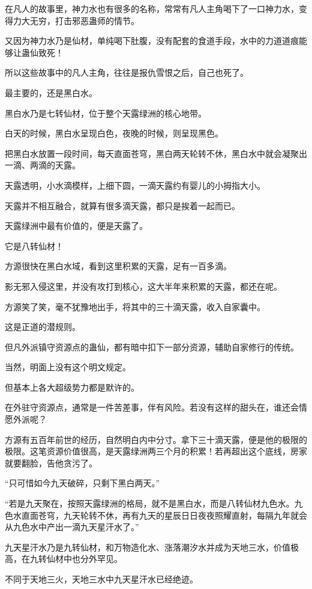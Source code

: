 \begin{this_body}
在凡人的故事里，神力水也有很多的名称，常常有凡人主角喝下了一口神力水，变得力大无穷，打击邪恶蛊师的情节。

又因为神力水乃是仙材，单纯喝下肚腹，没有配套的食道手段，水中的力道道痕能够让蛊仙致死！

所以这些故事中的凡人主角，往往是报仇雪恨之后，自己也死了。

最主要的，还是黑白水。

黑白水乃是七转仙材，位于整个天露绿洲的核心地带。

白天的时候，黑白水呈现白色，夜晚的时候，则呈现黑色。

把黑白水放置一段时间，每天直面苍穹，黑白两天轮转不休，黑白水中就会凝聚出一滴、两滴的天露。

天露透明，小水滴模样，上细下圆，一滴天露约有婴儿的小拇指大小。

天露并不相互融合，就算有很多滴天露，都只是挨着一起而已。

天露绿洲中最有价值的，便是天露了。

它是八转仙材！

方源很快在黑白水域，看到这里积累的天露，足有一百多滴。

影无邪入侵这里，并没有攻打到核心，这大半年来积累的天露，都还在呢。

方源笑了笑，毫不犹豫地出手，将其中的三十滴天露，收入自家囊中。

这是正道的潜规则。

但凡外派镇守资源点的蛊仙，都有暗中扣下一部分资源，辅助自家修行的传统。

当然，明面上没有这个明文规定。

但基本上各大超级势力都是默许的。

在外驻守资源点，通常是一件苦差事，伴有风险。若没有这样的甜头在，谁还会情愿外派呢？

方源有五百年前世的经历，自然明白内中分寸。拿下三十滴天露，便是他的极限的极限。这笔资源价值很高，是天露绿洲两三个月的积累！若再超出这个底线，房家就要翻脸，告他贪污了。

“只可惜如今九天破碎，只剩下黑白两天。”

“若是九天聚在，按照天露绿洲的格局，就不是黑白水，而是八转仙材九色水。九色水直面苍穹，九天轮转不休，再有九天的星辰日日夜夜照耀直射，每隔九年就会从九色水中产出一滴九天星汗水了。”

九天星汗水乃是九转仙材，和万物造化水、涨落潮汐水并成为天地三水，价值极高，在九转仙材中也分外罕见。

不同于天地三火，天地三水中九天星汗水已经绝迹。


\end{this_body}
